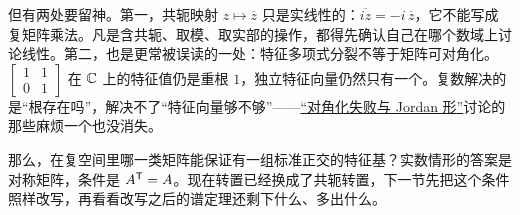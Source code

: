 但有两处要留神。第一，共轭映射 \(z\mapsto\overline z\) 只是实线性的：\(\overline{iz}=-i\,\overline z\)，它不能写成复矩阵乘法。凡是含共轭、取模、取实部的操作，都得先确认自己在哪个数域上讨论线性。第二，也是更常被误读的一处：特征多项式分裂不等于矩阵可对角化。\(\begin{bmatrix}1&1\\0&1\end{bmatrix}\) 在 \(\mathbb{C}\) 上的特征值仍是重根 \(1\)，独立特征向量仍然只有一个。复数解决的是``根存在吗''，解决不了``特征向量够不够''——\hyperref[sec:03-Linear-Algebra/05-Eigenvalues-and-Eigenvectors/03]{``对角化失败与 Jordan 形''}讨论的那些麻烦一个也没消失。

那么，在复空间里哪一类矩阵能保证有一组标准正交的特征基？实数情形的答案是对称矩阵，条件是 \(A^{\mathsf{T}}=A\)。现在转置已经换成了共轭转置，下一节先把这个条件照样改写，再看看改写之后的谱定理还剩下什么、多出什么。
